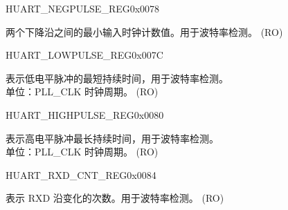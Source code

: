 \begin{register}{H}{UART\_NEGPULSE\_REG}{0x0078}\label{regdesc:UARTNEGPULSEREG}
%
%
\regnewline%
\begin{regdesc}\begin{reglist}
\label{fielddesc:UARTNEGEDGEMINCNT}\item [UART\_NEGEDGE\_MIN\_CNT] 两个下降沿之间的最小输入时钟计数值。用于波特率检测。 (RO)
\end{reglist}\end{regdesc}
\end{register}


\begin{register}{H}{UART\_LOWPULSE\_REG}{0x007C}\label{regdesc:UARTLOWPULSEREG}
%
%
\regnewline%
\begin{regdesc}\begin{reglist}
\label{fielddesc:UARTLOWPULSEMINCNT}\item [UART\_LOWPULSE\_MIN\_CNT] 表示低电平脉冲的最短持续时间，用于波特率检测。\\单位：PLL\_CLK 时钟周期。 (RO)
\end{reglist}\end{regdesc}
\end{register}


\begin{register}{H}{UART\_HIGHPULSE\_REG}{0x0080}\label{regdesc:UARTHIGHPULSEREG}
%
%
\regnewline%
\begin{regdesc}\begin{reglist}
\label{fielddesc:UARTHIGHPULSEMINCNT}\item [UART\_HIGHPULSE\_MIN\_CNT] 表示高电平脉冲最长持续时间，用于波特率检测。\\单位：PLL\_CLK 时钟周期。 (RO)
\end{reglist}\end{regdesc}
\end{register}


\begin{register}{H}{UART\_RXD\_CNT\_REG}{0x0084}\label{regdesc:UARTRXDCNTREG}
%
%
\regnewline%
\begin{regdesc}\begin{reglist}
\label{fielddesc:UARTRXDEDGECNT}\item [UART\_RXD\_EDGE\_CNT] 表示 RXD 沿变化的次数。用于波特率检测。 (RO)
\end{reglist}\end{regdesc}
\end{register}


